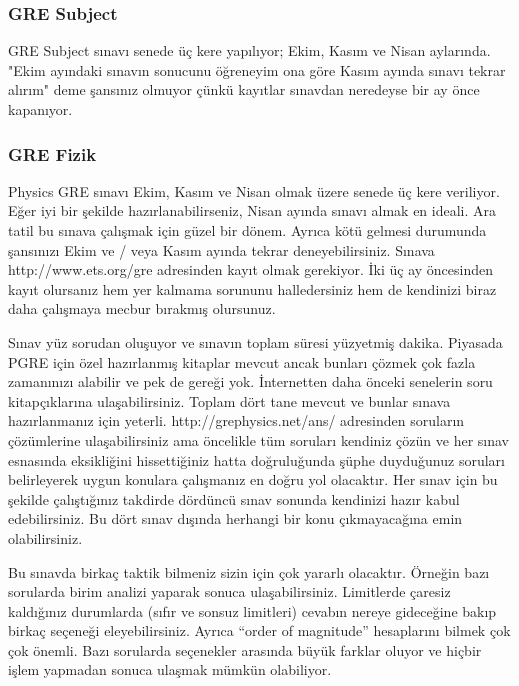 \documentclass[12pt]{article}
\begin{document}
\subsubsection{GRE Subject}
GRE Subject sınavı senede üç kere yapılıyor; Ekim, Kasım ve Nisan aylarında. "Ekim ayındaki sınavın sonucunu öğreneyim ona göre Kasım ayında sınavı tekrar alırım" deme şansınız olmuyor çünkü kayıtlar sınavdan neredeyse bir ay önce kapanıyor.

\subsubsection{GRE Fizik}
Physics GRE sınavı Ekim, Kasım ve Nisan olmak üzere senede üç kere veriliyor. Eğer iyi bir şekilde hazırlanabilirseniz, Nisan ayında sınavı almak en ideali. Ara tatil bu sınava çalışmak için güzel bir dönem. Ayrıca kötü gelmesi durumunda şansınızı Ekim ve / veya Kasım ayında tekrar deneyebilirsiniz. Sınava http://www.ets.org/gre adresinden kayıt olmak gerekiyor. İki üç ay öncesinden kayıt olursanız hem yer kalmama sorununu halledersiniz hem de kendinizi biraz daha çalışmaya mecbur bırakmış olursunuz. 

Sınav yüz sorudan oluşuyor ve sınavın toplam süresi yüzyetmiş dakika. Piyasada PGRE için özel hazırlanmış kitaplar mevcut ancak bunları çözmek çok fazla zamanınızı alabilir ve pek de gereği yok. İnternetten daha önceki senelerin soru kitapçıklarına ulaşabilirsiniz. Toplam dört tane mevcut ve bunlar sınava hazırlanmanız için yeterli. http://grephysics.net/ans/ adresinden soruların çözümlerine ulaşabilirsiniz ama öncelikle tüm soruları kendiniz çözün ve her sınav esnasında eksikliğini hissettiğiniz hatta doğruluğunda şüphe duyduğunuz soruları belirleyerek uygun konulara çalışmanız en doğru yol olacaktır. Her sınav için bu şekilde çalıştığınız takdirde dördüncü sınav sonunda kendinizi hazır kabul edebilirsiniz. Bu dört sınav dışında herhangi bir konu çıkmayacağına emin olabilirsiniz. 

Bu sınavda birkaç taktik bilmeniz sizin için çok yararlı olacaktır. Örneğin bazı sorularda birim analizi yaparak sonuca ulaşabilirsiniz. Limitlerde çaresiz kaldığınız durumlarda (sıfır ve sonsuz limitleri) cevabın nereye gideceğine bakıp birkaç seçeneği eleyebilirsiniz. Ayrıca “order of magnitude” hesaplarını bilmek çok çok önemli. Bazı sorularda seçenekler arasında büyük farklar oluyor ve hiçbir işlem yapmadan sonuca ulaşmak mümkün olabiliyor. 
\end{document}
